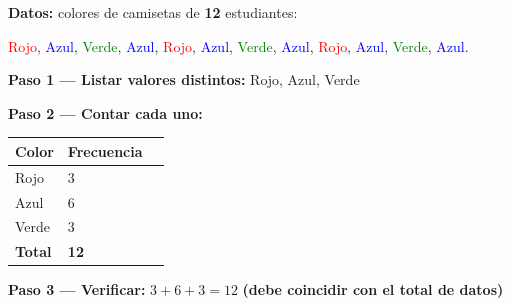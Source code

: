 \documentclass[12pt, letterpaper]{article}
\begin{document}
	\begin{ejemplo}
		\textbf{Datos:} colores de camisetas de \textbf{12} estudiantes:
		
		\textcolor{red}{Rojo}, \textcolor{blue}{Azul}, \textcolor{green}{Verde}, \textcolor{blue}{Azul}, \textcolor{red}{Rojo}, \textcolor{blue}{Azul}, \textcolor{green}{Verde}, \textcolor{blue}{Azul}, \textcolor{red}{Rojo}, \textcolor{blue}{Azul}, \textcolor{green}{Verde}, \textcolor{blue}{Azul}.
		
		\textbf{Paso 1 — Listar valores distintos:}\quad
		Rojo, Azul, Verde
		
		\textbf{Paso 2 — Contar cada uno:}
		\begin{center}
			\renewcommand{\arraystretch}{1.5}
			\begin{tabular}{|m{3cm}|m{3.5cm}|m{2.5cm}|}
				\hline
				\rowcolor{valblue!20}\textbf{Color} & \textbf{Frecuencia} \\
				\hline
				Rojo  & 3 \\
				\hline
				Azul  & 6 \\
				\hline
				Verde & 3 \\
				\hline
				\rowcolor{valblue!10}\textbf{Total} & \textbf{12} \\
				\hline
			\end{tabular}
		\end{center}
		
		\textbf{Paso 3 — Verificar:}\; $3+6+3 = 12$ \;\checkmark\;
		\textbf{(debe coincidir con el total de datos)}
	\end{ejemplo}
	
\end{document}
